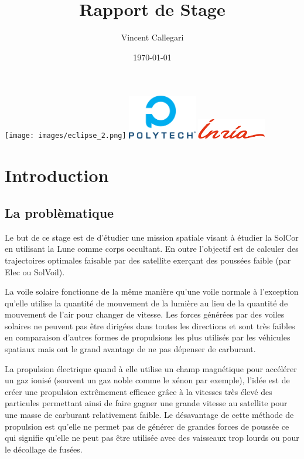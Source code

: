 \documentclass[12pt]{article} %
\title{Rapport de Stage} %
\author{Vincent Callegari} %
\date{\today} %
\begin{document}
		\maketitle
		\texttt{[image: images/eclipse\_2.png]}
		\vfill
		\includegraphics[width=3cm]{images/Logo_Reseau_Polytech.png} \hfill \includegraphics[width=3cm]{images/inria.png}
		\newpage
		\tableofcontents
		\newpage
		\section{Introduction}
		
		\subsection{La problèmatique}
		Le but de ce stage est de d'étudier une mission spatiale visant à étudier la \gls{SolCor} en utilisant la Lune comme corps occultant. En outre l'objectif est de calculer des trajectoires optimales faisable par des satellite exerçant des poussées faible (par \gls{Elec} ou \gls{SolVoil}).
		
		La voile solaire fonctionne de la même manière qu'une voile normale à l'exception qu'elle utilise la quantité de mouvement de la lumière au lieu de la quantité de mouvement de l'air pour changer de vitesse. Les forces générées par des voiles solaires ne peuvent pas être dirigées dans toutes les directions et sont très faibles en comparaison d'autres formes de propulsions les plus utilisés par les véhicules spatiaux mais ont le grand avantage de ne pas dépenser de carburant.
		
		La propulsion électrique quand à elle utilise un champ magnétique pour accélérer un gaz ionisé (souvent un gaz noble comme le xénon par exemple), l'idée est de créer une propulsion extrêmement efficace grâce à la vitesses très élevé des particules permettant ainsi de faire gagner une grande vitesse au satellite pour une masse de carburant relativement faible. Le désavantage de cette méthode de propulsion est qu'elle ne permet pas de générer de grandes forces de poussée ce qui signifie qu'elle ne peut pas être utilisée avec des vaisseaux trop lourds ou pour le décollage de fusées.
		
\end{document}
